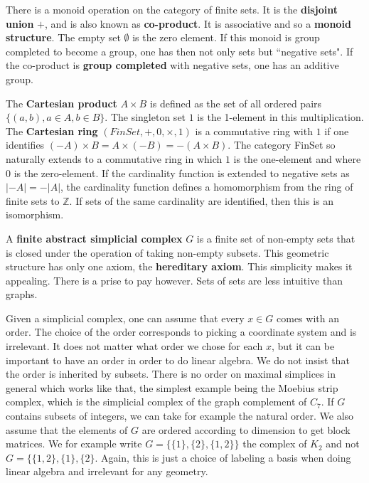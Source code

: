 \documentclass[12pt]{amsart}
\begin{document}
\vspace{3mm}
There is a monoid operation on the category of finite sets. It is the {\bf disjoint union} $+$,
and is also known as {\bf co-product}. It is associative and so a {\bf monoid structure}.
The empty set $\emptyset$ is the zero element. If this monoid is group completed 
to become a group, one has then not only sets but ``negative sets".
If the co-product is {\bf group completed} with negative
sets, one has an additive group. 

\vspace{3mm}
The {\bf Cartesian product} $A \times B$ is defined as the set of all ordered pairs $\{ (a,b), a \in A, b \in B\}$. 
The singleton set $1$ is the 1-element in this multiplication. The {\bf Cartesian ring} $(FinSet,+,0,\times,1)$ 
is a commutative ring with $1$ if one identifies $(-A) \times B = A \times (-B) = -(A \times B)$. 
The category FinSet
so naturally extends to a commutative ring in which $1$ is the one-element and where
$0$ is the zero-element. If the cardinality function is extended to negative sets as $|-A|=-|A|$, the
cardinality function defines a homomorphism from the ring of finite sets to $\mathbb{Z}$. If 
sets of the same cardinality are identified, then this is an isomorphism. 

\vspace{3mm}
A {\bf finite abstract simplicial complex} $G$ is a finite set of non-empty sets that
is closed under the operation of taking non-empty subsets. 
This geometric structure has only one axiom, the {\bf hereditary axiom}. This simplicity
makes it appealing. There is a prise to pay however. Sets of sets are less intuitive than
graphs. 

\vspace{3mm}
Given a simplicial complex, one can assume that every $x \in G$ comes with an order. The choice 
of the order corresponds to picking a coordinate system and is irrelevant. It does not matter
what order we chose for each $x$, but it can be important to have an order in order to do 
linear algebra. We do not insist that the order is inherited by subsets. There is no order
on maximal simplices in general which works like that, the simplest example being the Moebius
strip complex, which is the simplicial complex of the graph complement of $C_7$. 
If $G$ contains subsets of integers, we can take for example the natural order. We also
assume that the elements of $G$ are ordered according to dimension to get block matrices. 
We for example write $G=\{ \{1\},\{2\}, \{1,2\}\}$ the complex of $K_2$ and 
not $G=\{ \{1,2\},\{1\},\{2\}$. Again, this is just a choice of labeling a basis when
doing linear algebra and irrelevant for any geometry.
\end{document}
